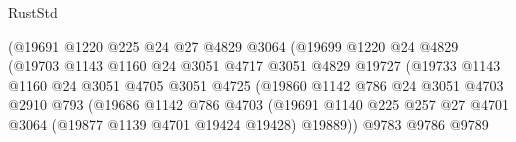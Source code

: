 \begin{lexlean}{RustStd}
\begin{coremodule}
                                    (@19691
                                      @1220
                                      @225
                                      @24
                                      @27
                                      @4829
                                      @3064
                                      (@19699
                                        @1220
                                        @24
                                        @4829
                                        (@19703
                                          @1143
                                          @1160
                                          @24
                                          @3051
                                          @4717
                                          @3051
                                          @4829
                                          @19727
                                          (@19733
                                            @1143
                                            @1160
                                            @24
                                            @3051
                                            @4705
                                            @3051
                                            @4725
                                            (@19860
                                              @1142
                                              @786
                                              @24
                                              @3051
                                              @4703
                                              @2910
                                              @793
                                              (@19686
                                                @1142
                                                @786
                                                @4703
                                                (@19691
                                                  @1140
                                                  @225
                                                  @257
                                                  @27
                                                  @4701
                                                  @3064
                                                  (@19877 @1139 @4701 @19424 @19428)
                                                  @19889))
                                              @9783
                                              @9786
                                              @9789

\end{coremodule}
\end{lexlean}
